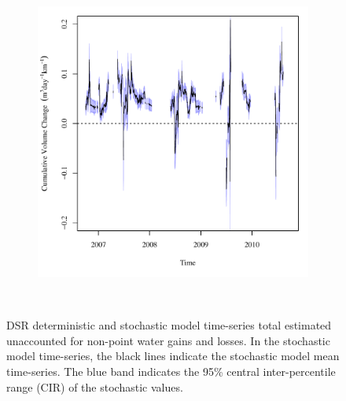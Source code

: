 \begin{linenumbers}
\begin{landscape}
\begin{figure}
\begin{subfigure}{0.7\textwidth}
			\includegraphics[width=\tableCustomSize]{"Figures/Results_DSR/Stochastic/Balance Water"}
		\end{subfigure}\\
		\caption[DSR deterministic and stochastic model time-series total estimated unaccounted for non-point water gains and losses.]{DSR deterministic and stochastic model time-series total estimated unaccounted for non-point water gains and losses.  In the stochastic model time-series, the black lines indicate the stochastic model mean time-series.  The blue band indicates the 95\% central inter-percentile range (CIR) of the stochastic values.}
		\label{fig:reachWater_DS}
	\end{figure}
\end{landscape}


\end{linenumbers}
